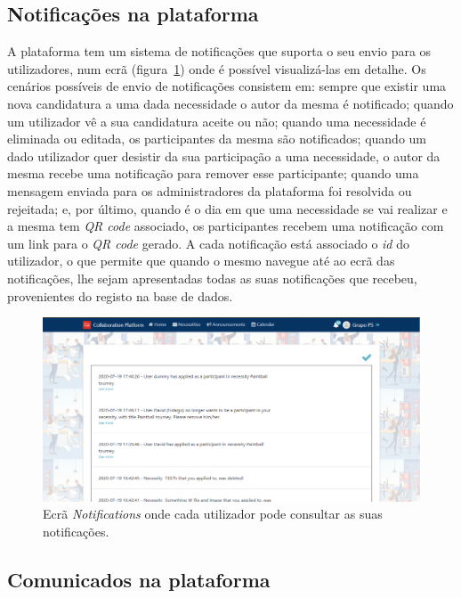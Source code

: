 \subsection{Notificações na plataforma}\label{subsec:implementacao:notificacoes}

A plataforma tem um sistema de notificações que suporta o seu envio para os utilizadores, num ecrã (figura~\ref{fig:notifications}) onde é possível visualizá-las em detalhe. 
Os cenários possíveis de envio de notificações consistem em: sempre que existir uma nova candidatura a uma dada necessidade o autor da mesma é notificado; 
quando um utilizador vê a sua candidatura aceite ou não; 
quando uma necessidade é eliminada ou editada, os participantes da mesma são notificados;
quando um dado utilizador quer desistir da sua participação a uma necessidade, o autor da mesma recebe uma notificação para remover esse participante;
quando uma mensagem enviada para os administradores da plataforma foi resolvida ou rejeitada;
e, por último, quando é o dia em que uma necessidade se vai realizar e a mesma tem \textit{QR code} associado, os participantes recebem uma notificação com um link para o \textit{QR code} gerado.
A cada notificação está associado o \textit{id} do utilizador, o que permite que quando o mesmo navegue até ao ecrã das notificações, 
lhe sejam apresentadas todas as suas notificações que recebeu, provenientes do registo na base de dados.

\begin{figure}[H]
  \centering 
  \includegraphics[scale=0.4]{figures/Notifications.png}
  \caption{Ecrã \textit{Notifications} onde cada utilizador pode consultar as suas notificações.}\label{fig:notifications}
\end{figure}


\subsection{Comunicados na plataforma}\label{subsec:implementacao:comunicados}


